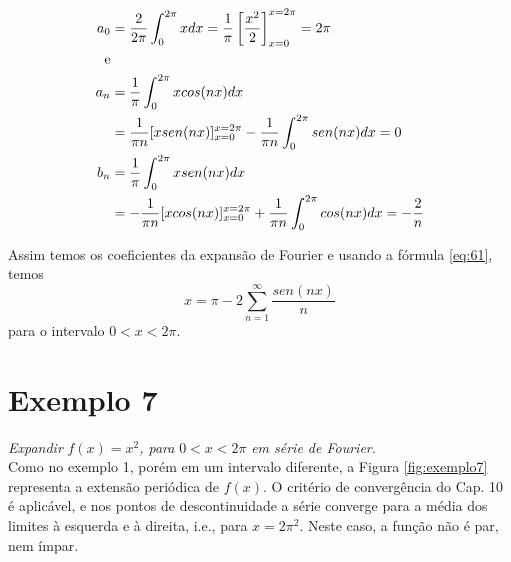\begin{equation}
    \notag
    \begin{split}
        a_0 &= \dfrac{2}{2\pi} \int_{0}^{2\pi}x dx = \dfrac{1}{\pi}\left[\dfrac{x^2}{2}\right]_{x=0}^{x=2\pi}=2\pi\\
        \text{e}&\\
        a_n &= \dfrac{1}{\pi}\int_{0}^{2\pi}x cos(nx)dx\\
        &= \dfrac{1}{\pi n}[x sen(nx)]_{x=0}^{x=2\pi} - \dfrac{1}{\pi n}\int_{0}^{2\pi}sen(nx)dx = 0\\
        b_n &= \dfrac{1}{\pi}\int_{0}^{2\pi}x sen(nx)dx\\
        &= - \dfrac{1}{\pi n}[x cos(nx)]_{x=0}^{x=2\pi} + \dfrac{1}{\pi n}\int_{0}^{2\pi}cos(nx)dx = -\dfrac{2}{n}
    \end{split} 
\end{equation}

Assim temos os coeficientes da expansão de Fourier e usando a fórmula \ref{eq:61}, temos
\begin{equation}
\label{eq:exemplo6SF}
    x = \pi - 2\sum\limits_{n=1}^{\infty}\dfrac{sen(nx)}{n}
\end{equation}
para o intervalo $0 < x < 2\pi$.

\section*{Exemplo 7}
\textit{Expandir }$f(x) = x^2$\textit{, para }$0 < x < 2\pi$\textit{ em série de Fourier.}\\

Como no exemplo 1, porém em um intervalo diferente, a Figura \ref{fig:exemplo7} representa a 
extensão periódica de $f(x)$. O critério de convergência do Cap. 10 é aplicável, e nos pontos 
de descontinuidade a série converge para a média dos limites à esquerda e à direita, i.e., 
para $x = 2\pi^2$. Neste caso, a função não é par, nem ímpar.

